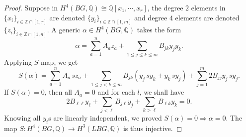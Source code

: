 \documentclass[10pt,a4paper]{amsart}
\def\bbQ{\mathbb{Q}}
\def\bbZ{\mathbb{Z}}
\newcommand{\be}{\begin{equation}}
\newcommand{\ee}{\end{equation}}
\begin{document}
\begin{proof}
    Suppose in $H^4(BG,\bbQ)\cong \bbQ[x_1,\cdots,x_r]$, the degree $2$ elements in $\{x_i\}_{i\in\bbZ\cap[1,r]}$ are denoted $\{y_i\}_{i\in \bbZ\cap [1,m]}$ and degree $4$ elements are denoted $\{z_i\}_{i\in \bbZ\cap [1,n]}$.
    A generic $\alpha\in  H^4(BG,\bbQ)$ takes the form
    \be \alpha = \sum_{a=1}^n A_a z_a + \sum_{1\le j\le k\le m}B_{jk}y_jy_k. \ee
    Applying $S$ map, we get
    \be  S(\alpha)=\sum_{a=1}^n A_a\,sz_a+\sum_{1\le j<k\le m}B_{jk}(y_j\,sy_k+y_k\,sy_j)+\sum_{j=1}^m2B_{jj}y_j\,sy_j. \ee
    If $S(\alpha) = 0$, then all $A_a = 0$ and for each $l$, we shall have
\be 2B_{\ell\ell}y_\ell+\sum_{j<\ell}B_{j\ell}y_j+\sum_{k>\ell}B_{\ell k}y_k=0.
\ee
Knowing all $y_i$s are linearly independent, we proved $S(\alpha) = 0 \Rightarrow \alpha = 0$. The map $S:H^4(BG,\bbQ) \to H^3(LBG,\bbQ)$ is thus injective.
\end{proof}
\end{document}
